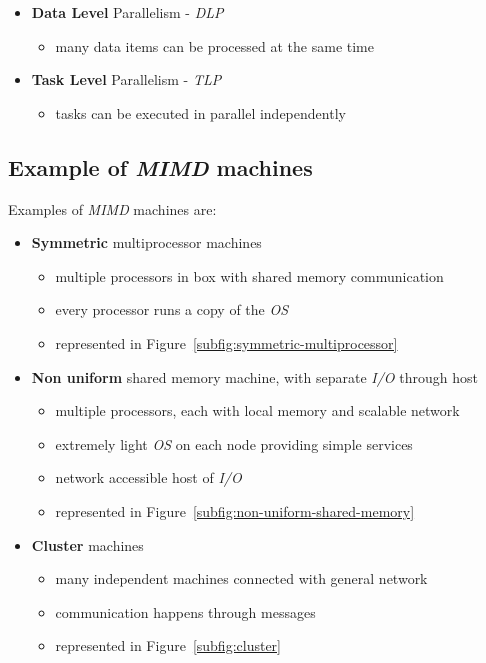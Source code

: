 \documentclass[english]{article}
\begin{document}
\begin{itemize}
  \item \textbf{Data Level} Parallelism - \textit{DLP}
        \begin{itemize}
          \item many data items can be processed at the same time
        \end{itemize}
  \item \textbf{Task Level} Parallelism - \textit{TLP}
        \begin{itemize}
          \item tasks can be executed in parallel independently
        \end{itemize}
\end{itemize}

\subsection{Example of \textit{MIMD} machines}

\bigskip
Examples of \textit{MIMD} machines are:

\begin{itemize}
  \item \textbf{Symmetric} multiprocessor machines
        \begin{itemize}
          \item multiple processors in box with shared memory communication
          \item every processor runs a copy of the \textit{OS}
          \item represented in Figure~\ref{subfig:symmetric-multiprocessor}
        \end{itemize}
  \item \textbf{Non uniform} shared memory machine, with separate \textit{I/O} through host
        \begin{itemize}
          \item multiple processors, each with local memory and scalable network
          \item extremely light \textit{OS} on each node providing simple services
          \item network accessible host of \textit{I/O}
          \item represented in Figure~\ref{subfig:non-uniform-shared-memory}
        \end{itemize}
  \item \textbf{Cluster} machines
        \begin{itemize}
          \item many independent machines connected with general network
          \item communication happens through messages
          \item represented in Figure~\ref{subfig:cluster}
        \end{itemize}
\end{itemize}
\end{document}
